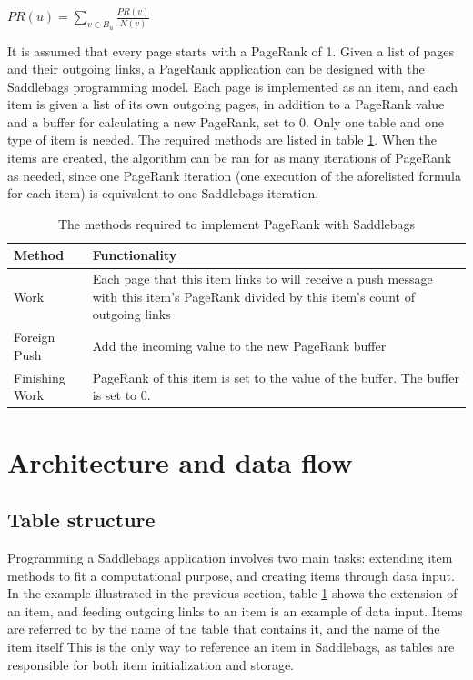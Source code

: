 \documentclass{uit-report}
\begin{document}
\vspace{10pt}
\begin{center}
${\displaystyle PR(u)=\sum_{v\in B_{u}}{\frac{PR(v)}{N(v)}}}$

\end{center}
\vspace{20pt}

It is assumed that every page starts with a PageRank of 1. Given a list of pages and their outgoing links, a PageRank application can be designed with the Saddlebags programming model. Each page is implemented as an item, and each item is given a list of its own outgoing pages, in addition to a PageRank value and a buffer for calculating a new PageRank, set to 0. Only one table and one type of item is needed. The required methods are listed in table \ref{table:pagerankevents}. When the items are created, the algorithm can be ran for as many iterations of PageRank as needed, since one PageRank iteration (one execution of the aforelisted formula for each item) is equivalent to one Saddlebags iteration.

\vspace{1.5cm}

\begin{table}[h]
	\setlength\arrayrulewidth{1pt}
	\renewcommand{\arraystretch}{2}
	\begin{tabular}{ | p{3cm} | p{12cm} |}
		\hline
		\textbf{Method} & \textbf{Functionality} \\ \hline
		Work & Each page that this item links to will receive a push message with this item's PageRank divided by this item's count of outgoing links \\ \hline
		Foreign Push & Add the incoming value to the new PageRank buffer \\ \hline
		Finishing Work & PageRank of this item is set to the value of the buffer. The buffer is set to 0.\\ \hline
		
	\end{tabular}
	\caption{The methods required to implement PageRank with Saddlebags}
	\label{table:pagerankevents}
\end{table}

\section{Architecture and data flow}
\subsection{Table structure}
Programming a Saddlebags application involves two main tasks: extending item methods to fit a computational purpose, and creating items through data input. In the example illustrated in the previous section, table \ref{table:pagerankevents} shows the extension of an item, and feeding outgoing links to an item is an example of data input. Items are referred to by the name of the table that contains it, and the name of the item itself This is the only way to reference an item in Saddlebags, as tables are responsible for both item initialization and storage.
\end{document}
